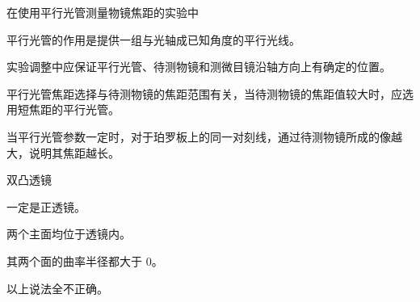 \documentclass[standard, analysis, notocnum]{ExBook}
\newcommand{\answerarea}[1][8cm]{%
  \par\vspace{2mm}%
  \noindent{\color{themeColor!35}\rule{\linewidth}{0.4pt}}\par
  \noindent\begin{minipage}[t][#1][t]{\linewidth}\vspace{0pt}\end{minipage}\par
  \noindent{\color{themeColor!35}\rule{\linewidth}{0.4pt}}\par
}
\begin{document}
\begin{qitems}
\begin{bbox}
\qitem 在使用平行光管测量物镜焦距的实验中
\par\noindent\hspace{2em}平行光管的作用是提供一组与光轴成已知角度的平行光线。
\par\noindent\hspace{2em}实验调整中应保证平行光管、待测物镜和测微目镜沿轴方向上有确定的位置。
\par\noindent\hspace{2em}平行光管焦距选择与待测物镜的焦距范围有关，当待测物镜的焦距值较大时，应选用短焦距的平行光管。
\par\noindent\hspace{2em}当平行光管参数一定时，对于珀罗板上的同一对刻线，通过待测物镜所成的像越大，说明其焦距越长。
\answerarea[3.5cm]
\end{bbox}
\begin{bbox}
\qitem 双凸透镜
\par\noindent\hspace{2em}一定是正透镜。
\par\noindent\hspace{2em}两个主面均位于透镜内。
\par\noindent\hspace{2em}其两个面的曲率半径都大于 0。
\par\noindent\hspace{2em}以上说法全不正确。
\answerarea[3.5cm]
\end{bbox}
\end{qitems}
\end{document}
